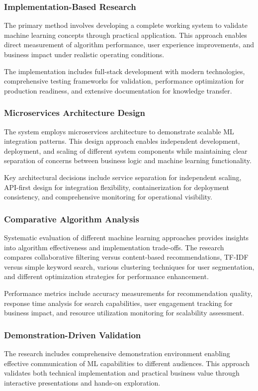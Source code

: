 \documentclass[12pt]{article}
\begin{document}
\subsubsection{Implementation-Based Research}
The primary method involves developing a complete working system to validate machine learning concepts through practical application. This approach enables direct measurement of algorithm performance, user experience improvements, and business impact under realistic operating conditions.

The implementation includes full-stack development with modern technologies, comprehensive testing frameworks for validation, performance optimization for production readiness, and extensive documentation for knowledge transfer.

\subsubsection{Microservices Architecture Design}
The system employs microservices architecture to demonstrate scalable ML integration patterns. This design approach enables independent development, deployment, and scaling of different system components while maintaining clear separation of concerns between business logic and machine learning functionality.

Key architectural decisions include service separation for independent scaling, API-first design for integration flexibility, containerization for deployment consistency, and comprehensive monitoring for operational visibility.

\subsubsection{Comparative Algorithm Analysis}
Systematic evaluation of different machine learning approaches provides insights into algorithm effectiveness and implementation trade-offs. The research compares collaborative filtering versus content-based recommendations, TF-IDF versus simple keyword search, various clustering techniques for user segmentation, and different optimization strategies for performance enhancement.

Performance metrics include accuracy measurements for recommendation quality, response time analysis for search capabilities, user engagement tracking for business impact, and resource utilization monitoring for scalability assessment.

\subsubsection{Demonstration-Driven Validation}
The research includes comprehensive demonstration environment enabling effective communication of ML capabilities to different audiences. This approach validates both technical implementation and practical business value through interactive presentations and hands-on exploration.
\end{document}
